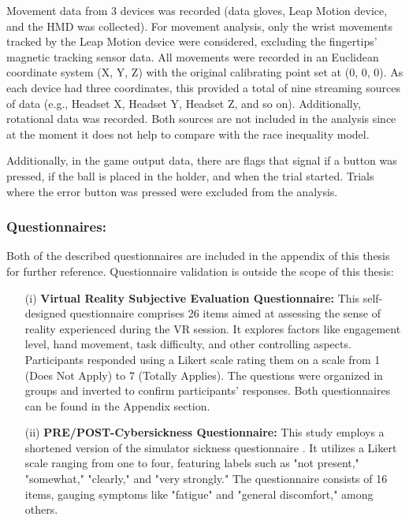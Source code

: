 \documentclass[12pt,oneside,openright]{report}
\begin{document}
Movement data from 3 devices was recorded (data gloves, Leap Motion device, and the HMD was collected). For movement analysis, only the wrist movements tracked by the Leap Motion device were considered, excluding the fingertips' magnetic tracking sensor data. All movements were recorded in an Euclidean coordinate system (X, Y, Z) with the original calibrating point set at (0, 0, 0). As each device had three coordinates, this provided a total of nine streaming sources of data (e.g., Headset X, Headset Y, Headset Z, and so on). Additionally, rotational data was recorded. Both sources are not included in the analysis since at the moment it does not help to compare with the race inequality model. 

Additionally, in the game output data, there are flags that signal if a button was pressed, if the ball is placed in the holder, and when the trial started. Trials where the error button was pressed were excluded from the analysis.

\subsubsection*{Questionnaires:}
Both of the described questionnaires are included in the appendix of this thesis for further reference. Questionnaire validation is outside the scope of this thesis:

\begin{enumerate}
\item[(i)] \textbf{Virtual Reality Subjective Evaluation Questionnaire:} This self-designed questionnaire comprises 26 items aimed at assessing the sense of reality experienced during the VR session. It explores factors like engagement level, hand movement, task difficulty, and other controlling aspects. Participants responded using a Likert scale rating them on a scale from 1 (Does Not Apply) to 7 (Totally Applies). The questions were organized in groups and inverted to confirm participants' responses. Both questionnaires can be found in the Appendix section.

\item[(ii)] \textbf{PRE/POST-Cybersickness Questionnaire:} This study employs a shortened version of the simulator sickness questionnaire \parencite{avpsy}. It utilizes a Likert scale ranging from one to four, featuring labels such as "not present," "somewhat," "clearly," and "very strongly." The questionnaire consists of 16 items, gauging symptoms like "fatigue" and "general discomfort," among others.
\end{enumerate}
\end{document}
